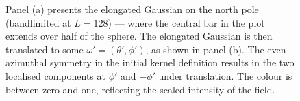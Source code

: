 \begin{figure}[htpb]
	\centering\capstart{}
	\hfill
	\caption[
		An elongated Gaussian on the north pole and then translated
	]{
		Panel (a) presents the elongated Gaussian on the north pole (bandlimited at \(L=128\)) --- where the central bar in the plot extends over half of the sphere.
		The elongated Gaussian is then translated to some \(\omega'=(\theta',\phi')\), as shown in panel (b).
		The even azimuthal symmetry in the initial kernel definition results in the two localised components at \(\phi'\) and \(-\phi'\) under translation.
		The colour is between zero and one, reflecting the scaled intensity of the field.
	}\label{fig:chapter3_elongated_gaussian}
\end{figure}
